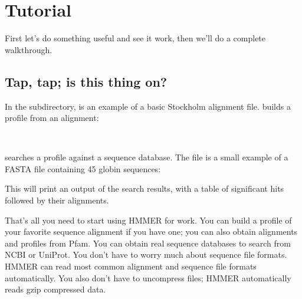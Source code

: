 
\chapter{Tutorial}
\label{chapter:tutorial}
\setcounter{footnote}{0}


First let's do something useful and see it work, then we'll do a
complete walkthrough.

\section{Tap, tap; is this thing on?}

In the  subdirectory,  is an example
of a basic Stockholm alignment file.  builds a profile
from an alignment:

  \vspace{1ex}
   \\
  \vspace{1ex}

 searches a profile against a sequence database.  The
file  is a small example of a FASTA file
containing 45 globin sequences:

  \vspace{1ex}
  \vspace{1ex}
  
This will print an output of the search results, with a table of
significant hits followed by their alignments.

That's all you need to start using HMMER for work. You can build
a profile of your favorite sequence alignment if you have one; you can
also obtain alignments and profiles from
Pfam. You can
obtain real sequence databases to search from
NCBI
or
UniProt.
You don't have to worry much about sequence file formats. HMMER can
read most common alignment and sequence file formats
automatically. You also don't have to uncompress  files;
HMMER automatically reads gzip compressed data.


